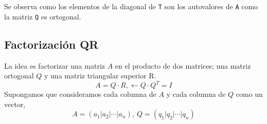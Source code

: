 Se observa como los elementos de la diagonal de \texttt{T} son los autovalores de \texttt{A}  como la matriz \texttt{Q} es ortogonal.
  
\subsection{Factorización QR} \label{QR}
La idea es factorizar una matriz $A$ en el producto de dos matrices; una matriz ortogonal $Q$ y una matriz triangular superior R.
\begin{equation*}
A=Q\cdot R, \leftarrow Q\cdot Q^T=I
\end{equation*}
Supongamos que consideramos cada columna de $A$ y cada columna de $Q$ como un vector,
\begin{equation*}
A=\left( a_1\vert a_2\vert \cdots \vert a_n\right), \ Q=\left( q_1\vert q_2\vert \cdots \vert q_n \right)
\end{equation*}


